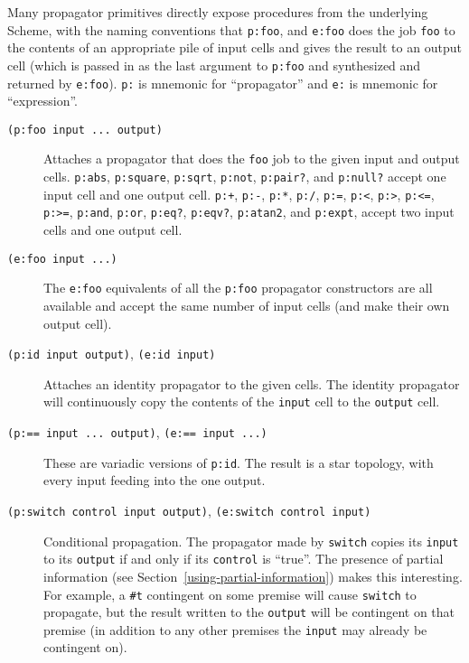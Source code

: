 \documentclass[12pt,letterpaper,english]{article}
\begin{document}
Many propagator primitives directly expose procedures from the
underlying Scheme, with the naming conventions that \texttt{p:foo}, and
\texttt{e:foo} does the job \texttt{foo} to the contents of an appropriate pile
of input cells and gives the result to an output cell (which is passed
in as the last argument to \texttt{p:foo} and synthesized and returned by
\texttt{e:foo}).  \texttt{p:} is mnemonic for ``propagator'' and \texttt{e:} is
mnemonic for ``expression''.
\begin{description}
\item[{\texttt{(p:foo input ... output)}}] \leavevmode 
Attaches a propagator that does the \texttt{foo} job to the given input
and output cells.  \texttt{p:abs}, \texttt{p:square}, \texttt{p:sqrt},
\texttt{p:not}, \texttt{p:pair?}, and \texttt{p:null?} accept one input cell and one
output cell.  \texttt{p:+}, \texttt{p:-}, \texttt{p:*}, \texttt{p:/}, \texttt{p:=}, \texttt{p:<},
\texttt{p:>}, \texttt{p:<=}, \texttt{p:>=}, \texttt{p:and}, \texttt{p:or}, \texttt{p:eq?},
\texttt{p:eqv?}, \texttt{p:atan2}, and \texttt{p:expt}, accept two input cells and one output
cell.

\item[{\texttt{(e:foo input ...)}}] \leavevmode 
The \texttt{e:foo} equivalents of all the \texttt{p:foo} propagator
constructors are all available and accept the same number of input
cells (and make their own output cell).

\item[{\texttt{(p:id input output)}, \texttt{(e:id input)}}] \leavevmode 
Attaches an identity propagator to the given cells.  The identity
propagator will continuously copy the contents of the \texttt{input} cell
to the \texttt{output} cell.

\item[{\texttt{(p:== input ... output)}, \texttt{(e:== input ...)}}] \leavevmode 
These are variadic versions of \texttt{p:id}.  The result is a
star topology, with every input feeding into the one output.

\item[{\texttt{(p:switch control input output)}, \texttt{(e:switch control input)}}] \leavevmode 
Conditional propagation.  The propagator made by \texttt{switch} copies
its \texttt{input} to its \texttt{output} if and only if its \texttt{control} is
``true''.  The presence of partial information (see Section~\ref{using-partial-information}) makes this
interesting.  For example, a \texttt{{\#}t} contingent on some premise will
cause \texttt{switch} to propagate, but the result written to the
\texttt{output} will be contingent on that premise (in addition to any
other premises the \texttt{input} may already be contingent on).


\end{description}
\end{document}
